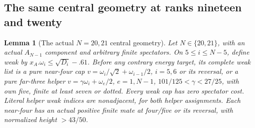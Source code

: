 \documentclass[11pt]{article}
\newtheorem{lemma}[theorem]{Lemma}
\theoremstyle{definition}
\theoremstyle{remark}
\begin{document}
\subsection{The same central geometry at ranks nineteen and twenty}
\label{app:tail:A19A20}
\begin{lemma}[The actual $N=20,21$ central geometry]
\label{app:tail:lem:Awindow2021}
Let $N\in\{20,21\}$, with an actual $A_{N-1}$ component and
arbitrary finite spectators. On $5\le i\le N-5$, define weak by
$x_A.\omega_i\le\sqrt{D_i}-.61$. Before any contrary energy target,
its complete weak list is a pure near-four cap
$v=\omega_i/\sqrt2+\omega_{i-1}/2$, $i=5,6$ or its reversal,
or a pure far-three helper
$v=\gamma\omega_i+\omega_e/2$, $e=1,N-1$,
$101/125<\gamma<27/25$, with own five, finite at least seven or
dotted. Every weak cap has zero spectator cost. Literal helper
weak indices are nonadjacent, for both helper assignments.
Each near-four has an actual positive finite mate at four/five or
its reversal, with normalized height $>43/50$.
\end{lemma}
\end{document}
